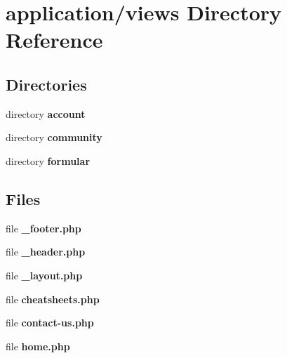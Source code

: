 \section{application/views Directory Reference}
\label{dir_47696c67d24d00a376c580718bcb3d63}
\subsection*{Directories}
\begin{DoxyCompactItemize}
\item 
directory {\bf account}
\item 
directory {\bf community}
\item 
directory {\bf formular}
\end{DoxyCompactItemize}
\subsection*{Files}
\begin{DoxyCompactItemize}
\item 
file {\bf \-\_\-footer.\-php}
\item 
file {\bf \-\_\-header.\-php}
\item 
file {\bf \-\_\-layout.\-php}
\item 
file {\bf cheatsheets.\-php}
\item 
file {\bf contact-\/us.\-php}
\item 
file {\bf home.\-php}
\end{DoxyCompactItemize}
